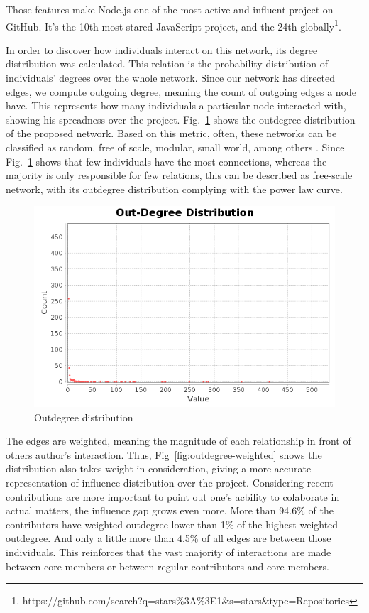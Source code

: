 \documentclass[conference]{IEEEtran}
\begin{document}
Those features make Node.js one of the most active and influent project on GitHub. It's the 10th most stared JavaScript project, and the 24th globally\footnote{https://github.com/search?q=stars\%3A\%3E1&s=stars&type=Repositories}.

In order to discover how individuals interact on this network, its degree distribution was calculated. This relation is the probability distribution of individuals' degrees over the whole network. Since our network has directed edges, we compute outgoing degree, meaning the count of outgoing edges a node have. This represents how many individuals a particular node interacted with, showing his spreadness over the project. Fig.~\ref{fig:outdegree} shows the outdegree distribution of the proposed network. Based on this metric, often, these networks can be classified as random, free of scale, modular, small world, among others \cite{cross2004}. Since Fig.~\ref{fig:outdegree} shows that few individuals have the most connections, whereas the majority is only responsible for few relations, this can be described as free-scale network, with its outdegree distribution complying with the power law curve.


\begin{figure}[htbp]
\centerline{\includegraphics[width=\linewidth]{images/outdegree}}
\caption{Outdegree distribution}
\label{fig:outdegree}
\end{figure}

The edges are weighted, meaning the magnitude of each relationship in front of others author's interaction. Thus, Fig~\ref{fig:outdegree-weighted} shows the distribution also takes weight in consideration, giving a more accurate representation of influence distribution over the project. Considering recent contributions are more important to point out one's acbility to colaborate in actual matters, the influence gap grows even more. More than 94.6\% of the contributors have weighted outdegree lower than 1\% of the highest weighted outdegree. And only a little more than 4.5\% of all edges are between those individuals. This reinforces that the vast majority of interactions are made between core members or between regular contributors and core members.
\end{document}

